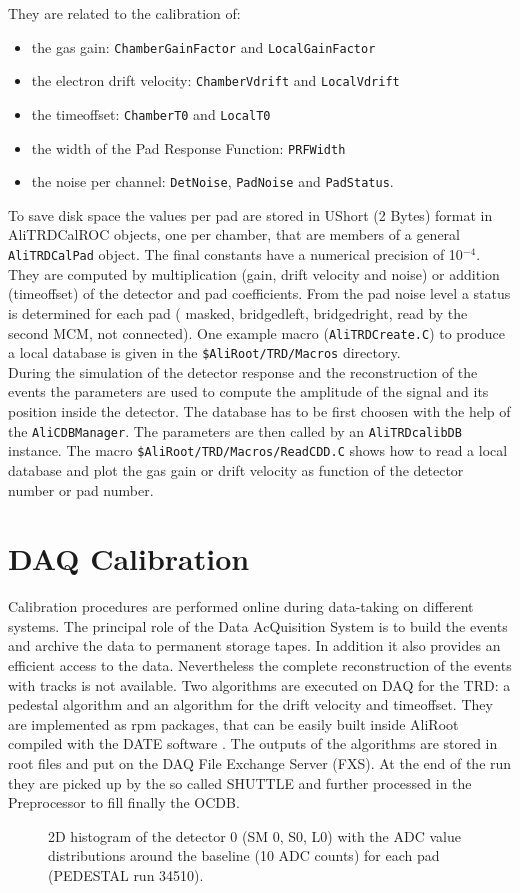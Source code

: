\documentclass{alicetdr}
\begin{document}
%
They are related to the calibration of:
\begin{itemize}
\item the gas gain: {\tt ChamberGainFactor} and {\tt LocalGainFactor}
\item the electron drift velocity: {\tt ChamberVdrift} and {\tt LocalVdrift}
\item the timeoffset: {\tt ChamberT0} and {\tt LocalT0}
\item the width of the Pad Response Function: {\tt PRFWidth}
\item the noise per channel: {\tt DetNoise}, {\tt PadNoise} and {\tt PadStatus}.
\end{itemize}
To save disk space the values per pad are stored in UShort (2 Bytes)
format in AliTRDCalROC objects, one per chamber, that are members of
a general {\tt AliTRDCalPad} object. The final constants have a
numerical precision of 10$^{-4}$. They are computed by
multiplication (gain, drift velocity and noise) or addition (timeoffset)
of the detector and pad coefficients. From the pad noise level a status
is determined for each pad ( masked, bridgedleft, bridgedright, read by
the second MCM, not connected). One example macro ({\tt AliTRDCreate.C})
to produce a local database is given in the {\tt \$AliRoot/TRD/Macros}
directory.\\
During the simulation of the detector response and the reconstruction
of the events the parameters are used to compute the amplitude of the
signal and its position inside the detector. The database has to be
first choosen with the help of the {\tt AliCDBManager}. The parameters
are then called by an {\tt AliTRDcalibDB} instance. The macro
{\tt \$AliRoot/TRD/Macros/ReadCDD.C} shows how to read a local database
and plot the gas gain or drift velocity as function of the detector
number or pad number.
%
\section{DAQ Calibration}
Calibration procedures are performed online during data-taking on
different systems. The principal role of the Data AcQuisition System is
to build the events and archive the data to permanent storage tapes. In
addition it also provides an efficient access to the data. Nevertheless
the complete reconstruction of the events with tracks is not available.
Two algorithms are executed on DAQ for the TRD: a pedestal algorithm and
an algorithm for the drift velocity and timeoffset. They are implemented
as rpm packages, that can be easily built inside AliRoot compiled with
the DATE software \cite{DATE}. The outputs of the algorithms are stored
in root files and put on the DAQ File Exchange Server (FXS). At the end
of the run they are picked up by the so called SHUTTLE and further
processed in the Preprocessor to fill finally the OCDB.
\begin{figure}[h]
  \centering\mbox{}
  \caption{\label{baselinenoisedet0run34510ex}2D histogram of the
detector 0 (SM 0, S0, L0) with the ADC value distributions around
the baseline (10 ADC counts) for each pad (PEDESTAL run 34510).}
\end{figure}
\end{document}
